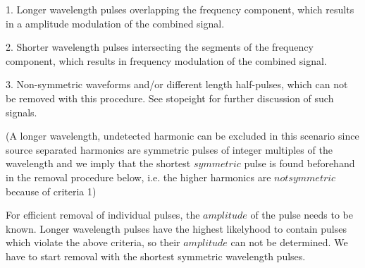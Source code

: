 \documentclass{article}
\begin{document}
1. Longer wavelength pulses overlapping the frequency component, which results in a amplitude modulation of the combined signal.

2. Shorter wavelength pulses intersecting the segments of the frequency component, which results in frequency modulation of the combined signal.

3. Non-symmetric waveforms and/or different length half-pulses, which can not be removed with this procedure. See stopeight for further discussion of such signals.

(A longer wavelength, undetected harmonic can be excluded in this scenario since source separated harmonics are symmetric pulses of integer multiples of the wavelength and we imply that the shortest $symmetric$ pulse is found beforehand in the removal procedure below, i.e. the higher harmonics are $not symmetric$ because of criteria 1)

For efficient removal of individual pulses, the $amplitude$ of the pulse needs to be known. Longer wavelength pulses have the highest likelyhood to contain pulses which violate the above criteria, so their $amplitude$ can not be determined. We have to start removal with the shortest symmetric wavelength pulses.
\end{document}
